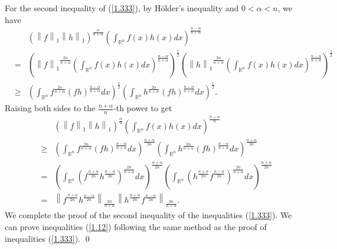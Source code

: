 \documentclass[preprint,12pt]{elsarticle}
\begin{document}
For the second inequality of (\ref{1.333}), by H\"older’s inequality and $0<\alpha <n$, we have
\begin{eqnarray*}
	&&\left ( \left \| f \right \|_{1}\left \| h \right \|_{1}    \right )^{\frac{\alpha }{n+\alpha} }\left ( \int_{\mathbb{R}^n }f\left ( x \right )h\left ( x \right )dx    \right )^{\frac{n-\alpha }{n+\alpha} }\nonumber\\
	&=&\left ( {\left \| f \right \|_{1}}^{\frac{2\alpha }{n+\alpha}}\left ( \int_{\mathbb{R}^n }f\left ( x \right )h\left ( x \right )dx    \right )^{\frac{n-\alpha }{n+\alpha} }    \right )^{\frac{1 }{2} }\left ( {\left \| h \right \|_{1}}^{\frac{2\alpha }{n+\alpha}}\left ( \int_{\mathbb{R}^n }f\left ( x \right )h\left ( x \right )dx    \right )^{\frac{n-\alpha }{n+\alpha} }    \right )^{\frac{1 }{2} }\nonumber\\
	&\ge&\left ( \int_{\mathbb{R}^n }  f ^{\frac{2\alpha }{n+\alpha} }( fh )^{\frac{n-\alpha }{n+\alpha} }    dx\right )^{\frac{1 }{2} }\left ( \int_{\mathbb{R}^n }  h ^{\frac{2\alpha }{n+\alpha} }( fh )^{\frac{n-\alpha }{n+\alpha} }    dx\right )^{\frac{1 }{2} }.
\end{eqnarray*} 
Raising both sides to the $\frac{n+\alpha}{n}$-th power to get
\begin{eqnarray*}
	&&\left ( \left \| f \right \|_{1}\left \| h \right \|_{1}    \right )^{\frac{\alpha }{n} }\left ( \int_{\mathbb{R}^n }f\left ( x \right )h\left ( x \right )dx    \right )^{\frac{n-\alpha }{n} }\nonumber\\
	&\ge&\left ( \int_{\mathbb{R}^n }  f ^{\frac{2\alpha }{n+\alpha} }( fh )^{\frac{n-\alpha }{n+\alpha} }    dx\right )^{\frac{n+\alpha }{2n} }\left ( \int_{\mathbb{R}^n }  h ^{\frac{2\alpha }{n+\alpha} }( fh )^{\frac{n-\alpha }{n+\alpha} }    dx\right )^{\frac{n+\alpha }{2n} }\nonumber\\
	&=&\left ( \int_{\mathbb{R}^n }  ( f ^{\frac{n+\alpha }{2n} }h ^{\frac{n-\alpha }{2n} } )^{\frac{2n }{n+\alpha} }    dx\right )^{\frac{n+\alpha }{2n} }\left ( \int_{\mathbb{R}^n }  ( h ^{\frac{n+\alpha }{2n} }f ^{\frac{n-\alpha }{2n} } )^{\frac{2n }{n+\alpha} }    dx\right )^{\frac{n+\alpha }{2n} }\nonumber\\
	&=& {\left \| {f}^{\frac{n+\alpha }{2n}} {h}^{\frac{n-\alpha }{2n}}\right \|}_{\frac{2n }{n+\alpha}}{\left \| {h}^{\frac{n+\alpha }{2n}} {f}^{\frac{n-\alpha }{2n}}\right \|}_{\frac{2n }{n+\alpha}}. 
\end{eqnarray*} 
We complete the proof of the second inequality of the inequalities (\ref{1.333}). We can prove inequalities (\ref{1.12}) following the same method as the proof of inequalities (\ref{1.333}).
\qed
\end{document}

